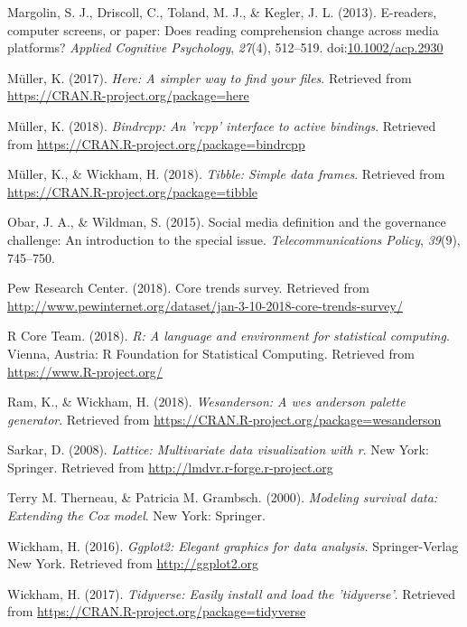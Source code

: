 \documentclass[man, fleqn, noextraspace]{apa6}
\theoremstyle{definition}
\theoremstyle{definition}
\theoremstyle{definition}
\theoremstyle{remark}
\begin{document}
\hypertarget{ref-Margolin2013}{}
Margolin, S. J., Driscoll, C., Toland, M. J., \& Kegler, J. L. (2013).
E-readers, computer screens, or paper: Does reading comprehension change
across media platforms? \emph{Applied Cognitive Psychology},
\emph{27}(4), 512--519.
doi:\href{https://doi.org/10.1002/acp.2930}{10.1002/acp.2930}

\hypertarget{ref-R-here}{}
Müller, K. (2017). \emph{Here: A simpler way to find your files}.
Retrieved from \url{https://CRAN.R-project.org/package=here}

\hypertarget{ref-R-bindrcpp}{}
Müller, K. (2018). \emph{Bindrcpp: An 'rcpp' interface to active
bindings}. Retrieved from
\url{https://CRAN.R-project.org/package=bindrcpp}

\hypertarget{ref-R-tibble}{}
Müller, K., \& Wickham, H. (2018). \emph{Tibble: Simple data frames}.
Retrieved from \url{https://CRAN.R-project.org/package=tibble}

\hypertarget{ref-Obar2015}{}
Obar, J. A., \& Wildman, S. (2015). Social media definition and the
governance challenge: An introduction to the special issue.
\emph{Telecommunications Policy}, \emph{39}(9), 745--750.

\hypertarget{ref-Pew}{}
Pew Research Center. (2018). Core trends survey. Retrieved from
\url{http://www.pewinternet.org/dataset/jan-3-10-2018-core-trends-survey/}

\hypertarget{ref-R-base}{}
R Core Team. (2018). \emph{R: A language and environment for statistical
computing}. Vienna, Austria: R Foundation for Statistical Computing.
Retrieved from \url{https://www.R-project.org/}

\hypertarget{ref-R-wesanderson}{}
Ram, K., \& Wickham, H. (2018). \emph{Wesanderson: A wes anderson
palette generator}. Retrieved from
\url{https://CRAN.R-project.org/package=wesanderson}

\hypertarget{ref-R-lattice}{}
Sarkar, D. (2008). \emph{Lattice: Multivariate data visualization with
r}. New York: Springer. Retrieved from
\url{http://lmdvr.r-forge.r-project.org}

\hypertarget{ref-R-survival-book}{}
Terry M. Therneau, \& Patricia M. Grambsch. (2000). \emph{Modeling
survival data: Extending the Cox model}. New York: Springer.

\hypertarget{ref-R-ggplot2}{}
Wickham, H. (2016). \emph{Ggplot2: Elegant graphics for data analysis}.
Springer-Verlag New York. Retrieved from \url{http://ggplot2.org}

\hypertarget{ref-R-tidyverse}{}
Wickham, H. (2017). \emph{Tidyverse: Easily install and load the
'tidyverse'}. Retrieved from
\url{https://CRAN.R-project.org/package=tidyverse}
\end{document}
